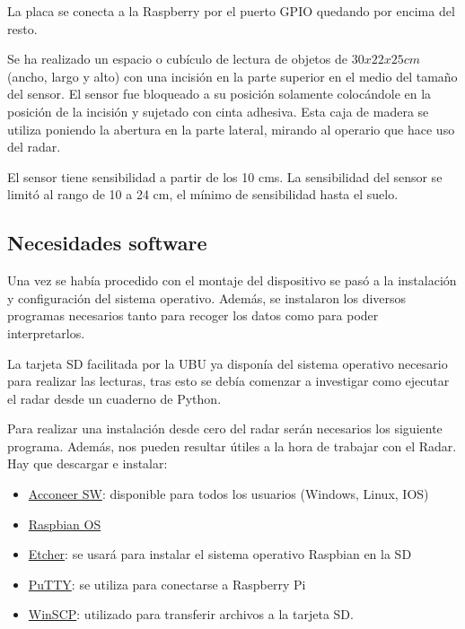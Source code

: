La placa se conecta a la Raspberry por el puerto GPIO quedando por encima del resto.


Se ha realizado un espacio o cubículo de lectura de objetos de $30x22x25 cm$ (ancho, largo y alto) con una incisión en la parte superior en el medio del tamaño del sensor. El sensor fue bloqueado a su posición solamente colocándole en la posición de la incisión y sujetado con cinta adhesiva. Esta caja de madera se utiliza poniendo la abertura en la parte lateral, mirando al operario que hace uso del radar.
 
El sensor tiene sensibilidad a partir de los 10 cms. La sensibilidad del sensor se limitó al rango de 10 a 24 cm, el mínimo de sensibilidad hasta el suelo.


\subsection{Necesidades software}

Una vez se había procedido con el montaje del dispositivo se pasó a la instalación y configuración del sistema operativo. Además, se instalaron los diversos programas necesarios tanto para recoger los datos como para poder interpretarlos.

La tarjeta SD facilitada por la UBU ya disponía del sistema operativo necesario para realizar las lecturas, tras esto se debía comenzar a investigar como ejecutar el radar desde un cuaderno de Python.

Para realizar una instalación desde cero del radar serán necesarios los siguiente programa. Además, nos pueden resultar útiles a la hora de trabajar con el Radar. 
Hay que descargar e instalar: 
\begin{itemize}
\item \href{http://developer.acconeer.com}{Acconeer SW}: disponible para todos los usuarios (Windows, Linux, IOS) 
\item \href{www.raspberrypi.org}{Raspbian OS} 
\item \href{http://www.etcher.io}{Etcher}: se usará para instalar el sistema operativo Raspbian en la SD
\item \href{http://www.putty.org}{PuTTY}: se utiliza para conectarse a Raspberry Pi
\item \href{http://www.winscp.net}{WinSCP}: utilizado para transferir archivos a la tarjeta SD.
\end{itemize}
 
